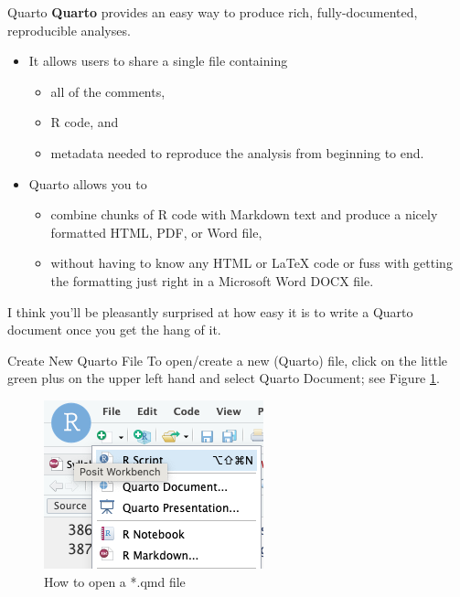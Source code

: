 \documentclass[
  ignorenonframetext,
]{beamer}
\providecommand{\tightlist}{%
  \setlength{\itemsep}{0pt}\setlength{\parskip}{0pt}}
\begin{document}
\begin{frame}{Quarto}
\protect\hypertarget{quarto-1}{}
\textbf{Quarto} provides an easy way to produce rich, fully-documented,
reproducible analyses.

\begin{itemize}
\item
  It allows users to share a single file containing

  \begin{itemize}
  \tightlist
  \item
    all of the comments,
  \item
    R code, and
  \item
    metadata needed to reproduce the analysis from beginning to end.
  \end{itemize}
\item
  Quarto allows you to

  \begin{itemize}
  \tightlist
  \item
    combine chunks of R code with Markdown text and produce a nicely
    formatted HTML, PDF, or Word file,
  \item
    without having to know any HTML or LaTeX code or fuss with getting
    the formatting just right in a Microsoft Word DOCX file.
  \end{itemize}
\end{itemize}

I think you'll be pleasantly surprised at how easy it is to write a
Quarto document once you get the hang of it.
\end{frame}

\begin{frame}{Create New Quarto File}
\protect\hypertarget{create-new-quarto-file}{}
To open/create a new (Quarto) file, click on the little green plus on
the upper left hand and select Quarto Document; see Figure
\ref{fig:open_qmd}.

\small
\begin{figure}

{\centering \includegraphics[width=0.5\linewidth,height=0.5\textheight]{how_to_open_qmd} 

}

\caption{How to open a *.qmd file}\label{fig:open_qmd}
\end{figure}
\normalsize
\end{frame}
\end{document}
